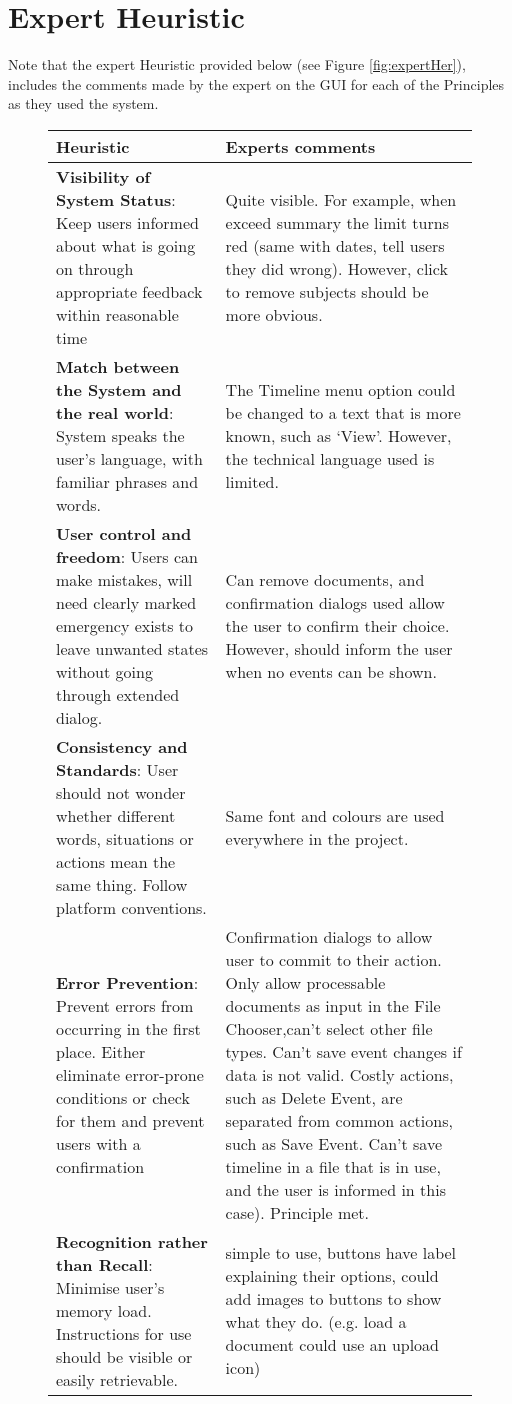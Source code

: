 \section{Expert Heuristic}
\par Note that the expert Heuristic provided below (see Figure \ref{fig:expertHer}), includes the comments made by the expert on the GUI for each of the Principles as they used the system.
\begin{figure}[h]
\begin{tabular}{|p{6cm}|p{8cm}|}
\hline
Heuristic & Experts comments \\
\hline
\hline
\textbf{Visibility of System Status}: Keep users informed about what is going on through appropriate feedback within reasonable time & Quite visible. For example, when exceed summary the limit turns red (same with dates, tell users they did wrong). However, click to remove subjects should be more obvious.\\
\hline
\textbf{Match between the System and the real world}: System speaks the user’s language, with familiar phrases and words. & The Timeline menu option could be changed to a text that is more known, such as `View'. However, the technical language used is limited.\\
\hline
\textbf{User control and freedom}: Users can make mistakes, will need clearly marked emergency exists to leave unwanted states without going through extended dialog. & Can remove documents, and confirmation dialogs used allow the user to confirm their choice. However, should inform the user when no events can be shown.\\
\hline
\textbf{Consistency and Standards}: User should not wonder whether different words, situations or actions mean the same thing. Follow platform conventions. & Same font and colours are used everywhere in the project.\\
\hline
\textbf{Error Prevention}: Prevent errors from occurring in the first place. Either eliminate error-prone conditions or check for them and prevent users with a confirmation & Confirmation dialogs to allow user to commit to their action. Only allow processable documents as input in the File Chooser,can't select other file types. Can't save event changes if data is not valid. Costly actions, such as Delete Event, are separated from common actions, such as Save Event. Can't save timeline in a file that is in use, and the user is informed in this case). Principle met.\\
\hline
\textbf{Recognition rather than Recall}: Minimise user's memory load. Instructions for use should be visible or easily retrievable. &simple to use, buttons have label explaining their options, could add images to buttons to show what they do. (e.g. load a document could use an upload icon)\\

\end{tabular}
\end{figure}

